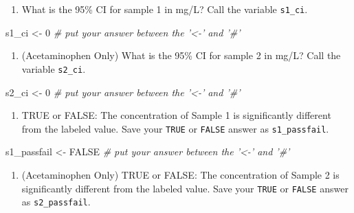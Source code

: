 \documentclass[]{tufte-book}
\newenvironment{Shaded}{}{}
\newcommand{\CommentTok}[1]{\textcolor[rgb]{0.38,0.63,0.69}{\textit{#1}}}
\newcommand{\DecValTok}[1]{\textcolor[rgb]{0.25,0.63,0.44}{#1}}
\newcommand{\NormalTok}[1]{#1}
\newcommand{\OtherTok}[1]{\textcolor[rgb]{0.00,0.44,0.13}{#1}}
\newcommand{\StringTok}[1]{\textcolor[rgb]{0.25,0.44,0.63}{#1}}
\providecommand{\tightlist}{%
  \setlength{\itemsep}{0pt}\setlength{\parskip}{0pt}}
\begin{document}
\begin{enumerate}
\def\labelenumi{\arabic{enumi}.}
\setcounter{enumi}{7}
\tightlist
\item
  What is the 95\% CI for sample 1 in mg/L? Call the variable \texttt{s1\_ci}.
\end{enumerate}

\begin{Shaded}
\begin{Highlighting}[]
\NormalTok{s1_ci <-}\StringTok{ }\DecValTok{0}     \CommentTok{# put your answer between the '<-' and '#'}
\end{Highlighting}
\end{Shaded}

\begin{enumerate}
\def\labelenumi{\arabic{enumi}.}
\setcounter{enumi}{8}
\tightlist
\item
  (Acetaminophen Only) What is the 95\% CI for sample 2 in mg/L? Call the variable \texttt{s2\_ci}.
\end{enumerate}

\begin{Shaded}
\begin{Highlighting}[]
\NormalTok{s2_ci <-}\StringTok{ }\DecValTok{0}     \CommentTok{# put your answer between the '<-' and '#'}
\end{Highlighting}
\end{Shaded}

\begin{enumerate}
\def\labelenumi{\arabic{enumi}.}
\setcounter{enumi}{9}
\tightlist
\item
  TRUE or FALSE: The concentration of Sample 1 is significantly different from the labeled value. Save your \texttt{TRUE} or \texttt{FALSE} answer as \texttt{s1\_passfail}.
\end{enumerate}

\begin{Shaded}
\begin{Highlighting}[]
\NormalTok{s1_passfail <-}\StringTok{ }\OtherTok{FALSE}     \CommentTok{# put your answer between the '<-' and '#'}
\end{Highlighting}
\end{Shaded}

\begin{enumerate}
\def\labelenumi{\arabic{enumi}.}
\setcounter{enumi}{10}
\tightlist
\item
  (Acetaminophen Only) TRUE or FALSE: The concentration of Sample 2 is significantly different from the labeled value. Save your \texttt{TRUE} or \texttt{FALSE} answer as \texttt{s2\_passfail}.
\end{enumerate}
\end{document}
